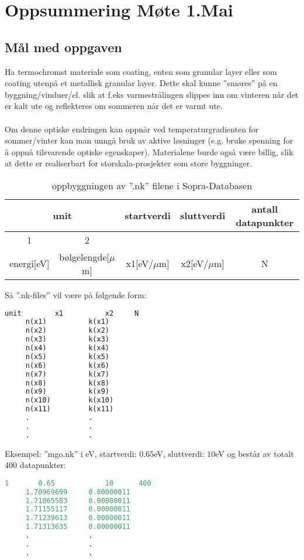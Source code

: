 \section{Oppsummering Møte 1.Mai}

\subsection{Mål med oppgaven}
Ha termochromst materiale som coating, enten som granular layer eller som coating utenpå et metallisk 
granular layer. Dette skal kunne ''smøres'' på en byggning/vinduer/el. slik at f.eks varmestrålingen 
slippes inn om vinteren når det er kalt ute og reflekteres om sommeren når det er varmt ute.
\\
\\
Om denne optiske endringen kan oppnår ved temperaturgradienten for sommer/vinter kan man unngå bruk av aktive
løsninger (e.g. bruke spenning for å oppnå tilsvarende optiske egenskaper). Materialene burde også
være billig, slik at dette er realiserbart for storskala-prosjekter som store byggninger.
%
\begin{table}[htbp]
   \caption{oppbyggningen av ''.nk'' filene i Sopra-Databasen}
\centering
\begin{tabular}{ c c c c c }
\hline
 \multicolumn{2}{c}{unit}         &  startverdi  &  sluttverdi & antall datapunkter \\
\hline
1          & 2                    &                 &                  & \\
energi[eV] & bølgelengde[$\mu$m]  &  x1[eV/$\mu$m]  &    x2[eV/$\mu$m] & N \\
\hline
\end{tabular}
\label{tab:idealTCW}
\end{table}
%

Så ''.nk-files'' vil være på følgende form:
\begin{lstlisting}[style=FormattedNumber, language=python]
unit		x1			x2	   N	
     n(x1)          k(x1) 
     n(x2)          k(x2) 
     n(x3)          k(x3) 
     n(x4)          k(x4) 
     n(x5)          k(x5) 
     n(x6)          k(x6) 
     n(x7)          k(x7) 
     n(x8)          k(x8) 
     n(x9)          k(x9) 
     n(x10)         k(x10) 
     n(x11)         k(x11) 
     .              .
     .              .
     .              .
\end{lstlisting}
Eksempel: ''mgo.nk'' i eV, startverdi: $0.65$eV, sluttverdi: $10$eV og består av totalt
400 datapunkter:
\begin{lstlisting}[style=FormattedNumber, language=python]
1		0.65			10		400
     1.70969699     0.00000011
     1.71065583     0.00000011
     1.71155117     0.00000011
     1.71239613     0.00000011
     1.71313635     0.00000011
     .              .
     .              .
     .              .
\end{lstlisting}


